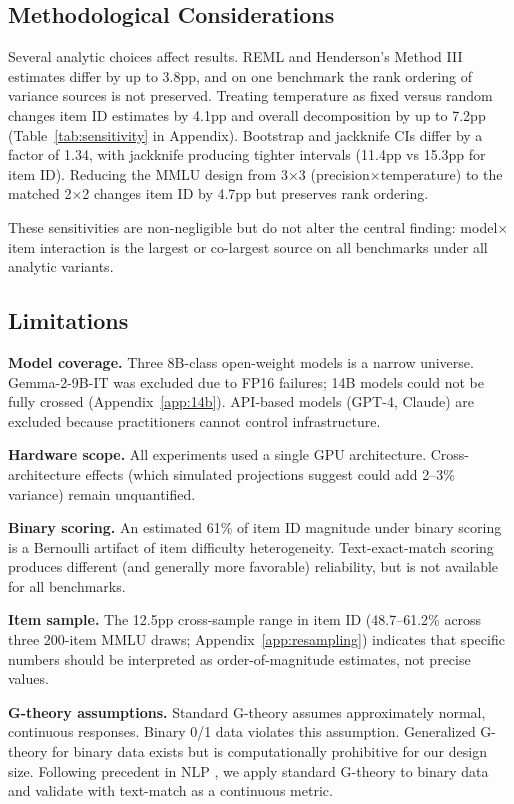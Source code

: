 \documentclass[11pt,twocolumn]{article}
\newcommand{\pct}{\%}
\begin{document}
\subsection{Methodological Considerations}
\label{sec:sensitivity}

Several analytic choices affect results. REML and Henderson's Method III estimates differ by up to 3.8pp, and on one benchmark the rank ordering of variance sources is not preserved. Treating temperature as fixed versus random changes item ID estimates by 4.1pp and overall decomposition by up to 7.2pp (Table~\ref{tab:sensitivity} in Appendix). Bootstrap and jackknife CIs differ by a factor of 1.34, with jackknife producing tighter intervals (11.4pp vs 15.3pp for item ID). Reducing the MMLU design from 3$\times$3 (precision$\times$temperature) to the matched 2$\times$2 changes item ID by 4.7pp but preserves rank ordering.

These sensitivities are non-negligible but do not alter the central finding: model$\times$item interaction is the largest or co-largest source on all benchmarks under all analytic variants.

\subsection{Limitations}

\textbf{Model coverage.} Three 8B-class open-weight models is a narrow universe. Gemma-2-9B-IT was excluded due to FP16 failures; 14B models could not be fully crossed (Appendix~\ref{app:14b}). API-based models (GPT-4, Claude) are excluded because practitioners cannot control infrastructure.

\textbf{Hardware scope.} All experiments used a single GPU architecture. Cross-architecture effects (which simulated projections suggest could add 2--3\pct{} variance) remain unquantified.

\textbf{Binary scoring.} An estimated 61\pct{} of item ID magnitude under binary scoring is a Bernoulli artifact of item difficulty heterogeneity. Text-exact-match scoring produces different (and generally more favorable) reliability, but is not available for all benchmarks.

\textbf{Item sample.} The 12.5pp cross-sample range in item ID (48.7--61.2\pct{} across three 200-item MMLU draws; Appendix~\ref{app:resampling}) indicates that specific numbers should be interpreted as order-of-magnitude estimates, not precise values.

\textbf{G-theory assumptions.} Standard G-theory assumes approximately normal, continuous responses. Binary 0/1 data violates this assumption. Generalized G-theory for binary data \cite{brennan2001generalizability} exists but is computationally prohibitive for our design size. Following precedent in NLP \cite{lalor2019learning}, we apply standard G-theory to binary data and validate with text-match as a continuous metric.
\end{document}
